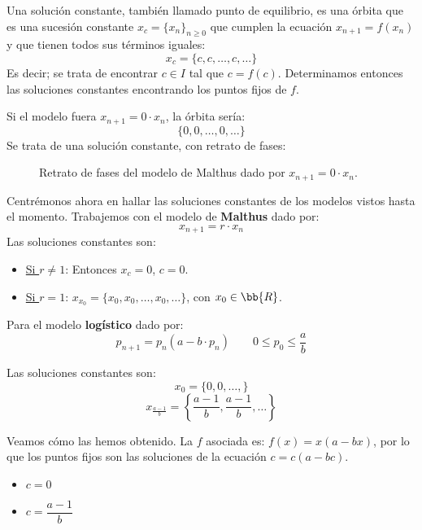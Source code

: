 \begin{definicion}
    Una solución constante, también llamado punto de equilibrio, es una órbita que es una sucesión constante 
    $ x_c = \{x_n\}_{n\geq 0}$ que cumplen la ecuación $x_{n+1} = f(x_n)$ y que tienen todos sus términos iguales:
    $$x_c = \{ c, c, \ldots, c, \ldots \} $$
    Es decir; se trata de encontrar $c \in I$ tal que $c = f(c)$. Determinamos entonces las soluciones constantes encontrando los puntos fijos de $f$.
\end{definicion}
\begin{ejemplo}
    \noindent
    Si el modelo fuera $x_{n+1} = 0 \cdot x_n$, la órbita sería:
    $$\{0, 0, \ldots, 0, \ldots \}$$
    Se trata de una solución constante, con retrato de fases:
    \begin{figure}[H]
        \centering
        \caption{Retrato de fases del modelo de Malthus dado por $x_{n+1}=0\cdot x_n$.}
    \end{figure}
\end{ejemplo}


Centrémonos ahora en hallar las soluciones constantes de los modelos vistos hasta el momento. Trabajemos con el modelo de \textbf{Malthus} dado por:
$$x_{n+1} = r \cdot x_n$$
Las soluciones constantes son:
\begin{itemize}
    \item \ul{Si $r \neq 1$}:
    Entonces $x_c = 0$, $c = 0$.
    \item \ul{Si $r=1$}:
    $x_{x_0} = \{ x_0, x_0, \ldots, x_0, \ldots \}$, con $x_0 \in \bb{R}$.
\end{itemize}

Para el modelo \textbf{logístico} dado por: $$p_{n+1} = p_n(a-b\cdot p_n)\qquad 0 \leq p_0 \leq \dfrac{a}{b}$$

Las soluciones constantes son:
$$x_0 = \{0, 0, \ldots, \}$$
$$x_{\frac{a-1}{b}} = \left\{ \dfrac{a-1}{b}, \dfrac{a-1}{b}, \ldots \right\}$$

Veamos cómo las hemos obtenido. La $f$ asociada es: $f(x) = x(a-bx)$, por lo que los puntos fijos son las soluciones de la ecuación $c=c(a-bc)$.
\begin{itemize}
    \item $c = 0$
    \item $c = \dfrac{a-1}{b}$
\end{itemize}

